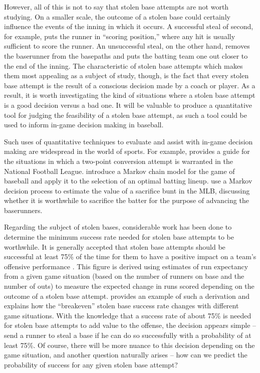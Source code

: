 \documentclass{article}
\begin{document}
However, all of this is not to say that stolen base attempts are not worth studying. On a smaller scale, the outcome of a stolen base could certainly influence the events of the inning in which it occurs. A successful steal of second, for example, puts the runner in “scoring position,” where any hit is usually sufficient to score the runner. An unsuccessful steal, on the other hand, removes the baserunner from the basepaths and puts the batting team one out closer to the end of the inning. The characteristic of stolen base attempts which makes them most appealing as a subject of study, though, is the fact that every stolen base attempt is the result of a conscious decision made by a coach or player. As a result, it is worth investigating the kind of situations where a stolen base attempt is a good decision versus a bad one. It will be valuable to produce a quantitative tool for judging the feasibility of a stolen base attempt, as such a tool could be used to inform in-game decision making in baseball. 

Such uses of quantitative techniques to evaluate and assist with in-game decision making are widespread in the world of sports. For example, \cite{morris} provides a guide for the situations in which a two-point conversion attempt is warranted in the National Football League. \cite{bukiet} introduce a Markov chain model for the game of baseball and apply it to the selection of an optimal batting lineup. \cite{hirotsu} use a Markov decision process to estimate the value of a sacrifice bunt in the MLB, discussing whether it is worthwhile to sacrifice the batter for the purpose of advancing the baserunners. 

Regarding the subject of stolen bases, considerable work has been done to determine the minimum success rate needed for stolen base attempts to be worthwhile. It is generally accepted that stolen base attempts should be successful at least 75\% of the time for them to have a positive impact on a team’s offensive performance \citep{Stolen-Base-Percentage}.  This figure is derived using estimates of run expectancy from a given game situation (based on the number of runners on base and the number of outs) to measure the expected change in runs scored depending on the outcome of a stolen base attempt. \cite{keyes} provides an example of such a derivation and explains how the “breakeven” stolen base success rate changes with different game situations. With the knowledge that a success rate of about 75\% is needed for stolen base attempts to add value to the offense, the decision appears simple – send a runner to steal a base if he can do so successfully with a probability of at least 75\%. Of course, there will be more nuance to this decision depending on the game situation, and another question naturally arises – how can we predict the probability of success for any given stolen base attempt?
\end{document}
